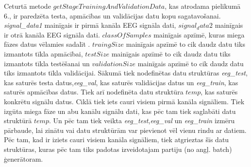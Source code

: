 \documentclass[12pt,paper=A4]{report}
\begin{document}
Ceturtā metode $getStageTrainingAndValidationData$, kas atrodama pielikumā 6., ir paredzēta testa, apmācības un validācijas datu kopu sagatavošanai. \textit{signal_data1} mainīgais ir pirmā kanāla EEG signāla dati, $signal_data2$ mainīgais ir otrā kanāla EEG signāla dati. $classOfSamples$ mainīgais apzīmē, kuras miega fāzes datus vēlamies sadalīt . $traingSize$ mainīgais apzīmē to cik daudz datu tiks izmantots tīkla apmācībai, $testSize$ mainīgais apzīmē to cik daudz datu tiks izmantots tīkla testēšanai un $validationSize$ mainīgais apzīmē to cik daudz datu tiks izmantots tīkla validācijai. Sākumā tiek nodefinētas datu struktūras \textit{eeg_test}, kas saturēs testa datus,\textit{eeg_val}, kas saturēs validācijas datus un \textit{eeg_train}, kas saturēs apmācības datus. Tiek arī nodefinēta datu struktūra $temp$, kas saturēs konkrētu signālu datus. Ciklā tiek iets cauri visiem pirmā kanāla signāliem. Tiek izgūta miega fāze un abu kanālu signālu dati, kas pēc tam tiek saglabāti datu struktūrā $temp$. Un pēc tam tiek veikta \textit{eeg_test},\textit{eeg_val} un \textit{eeg_train} izmēru pārbaude, lai zinātu vai datu struktūrām var pievienot vēl vienu rindu ar datiem. Pēc tam, kad ir iziets cauri visiem kanāla signāliem, tiek atgrieztas šīs datu struktūras, kuras pēc tam tiks padotas izveidotajam partiju (no angļ. batch) ģenerātoram. 
  


  
\end{document}
